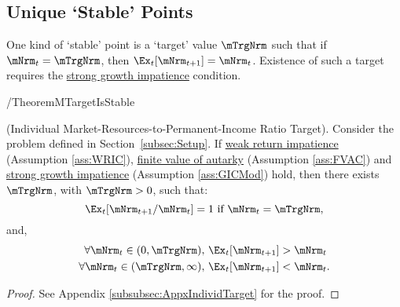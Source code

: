 \documentclass[BufferStockTheory]{subfiles}
\begin{document}

\hypertarget{onetarget}{}
\hypertarget{Unique-Stable-Points}{}


\subsection{Unique `Stable' Points}\label{subsec:onetarget}\hypertarget{TheoremTarget}{}

One kind of `stable' point is a `target' value $\mTrgNrm$ such that if $\mNrm_{t}=\mTrgNrm$, then $\Ex_{t}[\mNrm_{t+1}]=\mNrm_{t}$.
Existence of such a target requires the \hyperlink{GICMod}{strong growth impatience} condition.

\begin{verbatimwrite}{\EqDir/TheoremMTargetIsStable}
  \begin{theorem}\label{thm:target} (Individual Market-Resources-to-Permanent-Income Ratio Target).
    Consider the problem defined in Section~\ref{subsec:Setup}.
If \hyperlink{WRIC}{weak return impatience} (Assumption \ref{ass:WRIC}), \hyperlink{FVAC}{finite value of autarky} (Assumption \ref{ass:FVAC}) and \hyperlink{GICMod}{strong growth impatience} (Assumption \ref{ass:GICMod}) hold, then there exists $\mTrgNrm$, with $\mTrgNrm>0$, such that:
    \begin{equation}
      \Ex_t [{\mNrm}_{t+1}/\mNrm_t] = 1 \mbox{~if~} \mNrm_t = \mTrgNrm, 
      \label{eq:mTarget} %
    \end{equation}
    and, 
    \begin{equation}
      \label{eq:stability} %
      \begin{split}
        \forall {\mNrm}_t\in(0,\mTrgNrm),      \,\,& \Ex_t [{\mNrm}_{t+1}] > {\mNrm}_t  \\
        \forall {\mNrm}_t\in(\mTrgNrm,\infty), \,\,& \Ex_t [{\mNrm}_{t+1}] < {\mNrm}_t.
      \end{split}
    \end{equation}
  \end{theorem}
\end{verbatimwrite} \unskip


\begin{proof}\let\qed\relax
See Appendix \ref{subsubsec:AppxIndividTarget} for the proof.

\end{proof}
\end{document}
